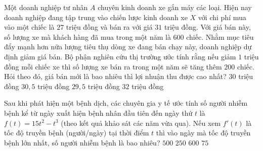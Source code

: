 \begin{ex}%
	Một doanh nghiệp tư nhân $A$ chuyên kinh doanh xe gắn máy các loại. Hiện nay doanh nghiệp đang tập trung vào chiến lược kinh doanh xe $X$ với chi phí mua vào một chiếc là $27$ triệu đồng và bán ra với giá $31$ triệu đồng. Với giá bán này, số lượng xe mà khách hàng đã mua trong một năm là $600$ chiếc. Nhằm mục tiêu đẩy mạnh hơn nữa lượng tiêu thụ dòng xe đang bán chạy này, doanh nghiệp  dự định giảm giá bán. Bộ phận nghiên cứu thị trường ước tính rằng nếu giảm $1$ triệu đồng mỗi chiếc xe thì số lượng xe bán ra trong một năm sẽ tăng thêm $200$ chiếc. Hỏi theo đó, giá bán mới là bao nhiêu thì lợi nhuận thu được cao nhất?
	 \choice
		{$30$ triệu  đồng}
		 {\True $30{,}5$ triệu đồng}
		{$29{,}5$ triệu đồng} 
		{$32$  triệu đồng}
\end{ex}

\begin{ex}%
	Sau khi phát hiện một bệnh dịch, các chuyên gia y tế ước tính số người nhiễm bệnh kể từ ngày xuất hiện bệnh nhân đầu tiên đến  ngày thứ $t$ là $f(t) =15t^2 -t^3$ (theo kết quả khảo sát các năm vừa qua). Nếu xem $f'(t)$ là tốc độ truyền bệnh (người/ngày) tại thời điểm $t$ thì vào ngày mà tốc độ truyền bệnh lớn nhất, số người nhiễm bệnh là bao nhiêu?
	\choice 
		{$500$} 
		 {\True $250$}
		{$600$} 
		{$75$} 
\end{ex}

